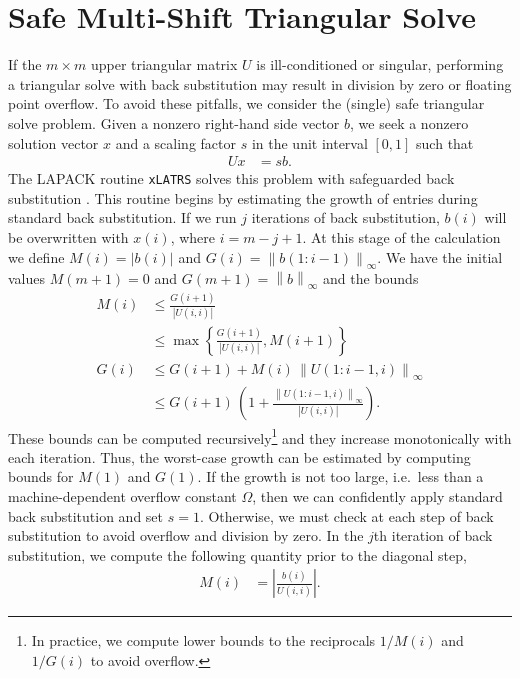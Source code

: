 \documentclass{article}
\begin{document}
\section{Safe Multi-Shift Triangular Solve}
If the \(m\times m\) upper triangular matrix \(U\) is ill-conditioned
or singular, performing a triangular solve with back substitution may
result in division by zero or floating point overflow. To avoid these
pitfalls, we consider the (single) safe triangular solve
problem. Given a nonzero right-hand side vector \(b\), we seek a
nonzero solution vector \(x\) and a scaling factor \(s\) in the unit
interval \(\left[0,1\right]\) such that
\begin{align}
  U x &= s b.
\end{align}
The LAPACK routine \texttt{xLATRS} solves this problem with
safeguarded back substitution \cite{anderson1991robust}. This routine
begins by estimating the growth of entries during standard back
substitution. If we run \(j\) iterations of back substitution,
\(b(i)\) will be overwritten with \(x(i)\), where \(i=m-j+1\). At this
stage of the calculation we define \(M(i)=\left|b(i)\right|\) and
\(G(i)=\left\lVert b(1:i-1) \right\rVert_\infty\). We have the initial
values \(M(m+1)=0\) and \(G(m+1)=\left\lVert b \right\rVert_\infty\)
and the bounds
\begin{align}
  M(i)
  &\leq \frac{G(i+1)}{\left| U(i,i) \right|} \nonumber \\
  &\leq \max\left\lbrace \frac{G(i+1)}{\left|U(i,i)\right|}, M(i+1) \right\rbrace \\
  G(i)
  &\leq G(i+1) + M(i) \,\left\lVert U(1:i-1,i) \right\rVert_\infty \nonumber \\
  &\leq G(i+1) \,\left( 1 + \frac{\left\lVert U(1:i-1,i) \right\rVert_\infty}{\left| U(i,i) \right|} \right).
\end{align}
These bounds can be computed recursively\footnote{In practice, we
  compute lower bounds to the reciprocals \(1/M(i)\) and \(1/G(i)\) to
  avoid overflow.} and they increase monotonically with each
iteration. Thus, the worst-case growth can be estimated by computing
bounds for \(M(1)\) and \(G(1)\). If the growth is not too large,
i.e.\ less than a machine-dependent overflow constant \(\Omega\), then
we can confidently apply standard back substitution and set
\(s=1\). Otherwise, we must check at each step of back substitution to
avoid overflow and division by zero. In the \(j\)th iteration of back
substitution, we compute the following quantity prior to the diagonal
step,
\begin{align}
  M(i) &= \left| \frac{b(i)}{U(i,i)} \right|.
\end{align}
\end{document}
